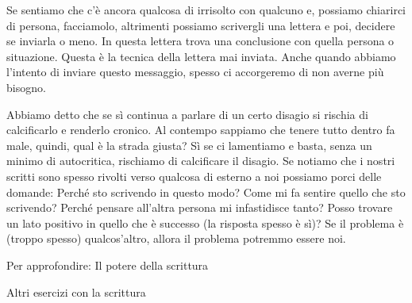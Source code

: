 \documentclass[12pt]{book} %
\begin{document}
Se sentiamo che c'è ancora qualcosa di irrisolto con qualcuno e, possiamo chiarirci di persona, facciamolo, altrimenti possiamo scrivergli una lettera e poi, decidere se inviarla o meno. In questa lettera trova una conclusione con quella persona o situazione.
Questa è la tecnica della lettera mai inviata. Anche quando abbiamo l'intento di inviare questo messaggio, spesso ci accorgeremo di non averne più bisogno.

Abbiamo detto che se sì continua a parlare di un certo disagio si rischia di calcificarlo e renderlo cronico. Al contempo sappiamo
che tenere tutto dentro fa male, quindi, qual è la strada giusta? Sì se ci lamentiamo e basta, senza un minimo di
autocritica, rischiamo di calcificare il disagio. Se notiamo che i nostri scritti sono spesso rivolti verso qualcosa di esterno a noi possiamo porci delle domande: 
Perché sto scrivendo in questo modo? Come mi fa sentire quello che sto scrivendo? Perché pensare all'altra persona mi infastidisce tanto? Posso trovare un lato positivo in quello che è successo (la risposta spesso è sì)?
Se il problema è (troppo spesso) qualcos'altro, allora il problema potremmo essere noi.

Per approfondire: Il potere della scrittura

Altri esercizi con la scrittura
\end{document}
